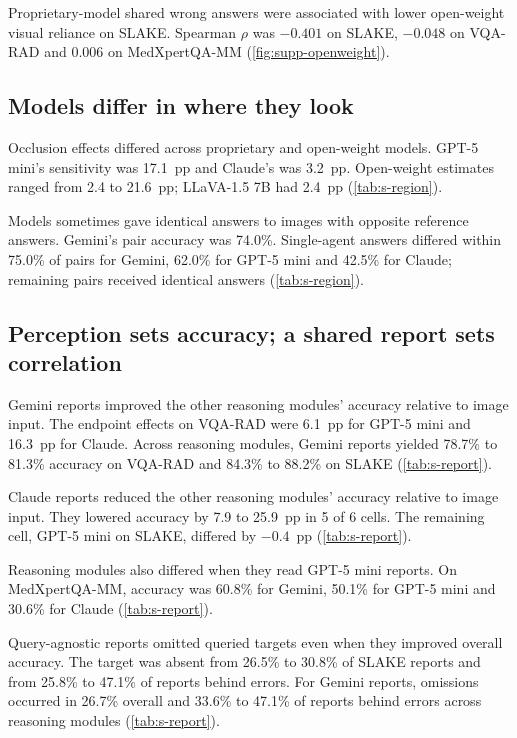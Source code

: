 Proprietary-model shared wrong answers were associated with lower open-weight visual reliance on SLAKE.
Spearman $\rho$ was $-0.401$ on SLAKE, $-0.048$ on VQA-RAD and 0.006 on MedXpertQA-MM (\cref{fig:supp-openweight}).

\subsection{Models differ in where they look}

Occlusion effects differed across proprietary and open-weight models.
GPT-5 mini's sensitivity was 17.1~pp and Claude's was 3.2~pp.
Open-weight estimates ranged from 2.4 to 21.6~pp; LLaVA-1.5 7B had 2.4~pp (\cref{tab:s-region}).

Models sometimes gave identical answers to images with opposite reference answers.
Gemini's pair accuracy was 74.0\%.
Single-agent answers differed within 75.0\% of pairs for Gemini, 62.0\% for GPT-5 mini and 42.5\% for Claude; remaining pairs received identical answers (\cref{tab:s-region}).

\subsection{Perception sets accuracy; a shared report sets correlation}

Gemini reports improved the other reasoning modules' accuracy relative to image input.
The endpoint effects on VQA-RAD were 6.1~pp for GPT-5 mini and 16.3~pp for Claude.
Across reasoning modules, Gemini reports yielded 78.7\% to 81.3\% accuracy on VQA-RAD and 84.3\% to 88.2\% on SLAKE (\cref{tab:s-report}).

Claude reports reduced the other reasoning modules' accuracy relative to image input.
They lowered accuracy by 7.9 to 25.9~pp in 5 of 6 cells.
The remaining cell, GPT-5 mini on SLAKE, differed by $-0.4$~pp (\cref{tab:s-report}).

Reasoning modules also differed when they read GPT-5 mini reports.
On MedXpertQA-MM, accuracy was 60.8\% for Gemini, 50.1\% for GPT-5 mini and 30.6\% for Claude (\cref{tab:s-report}).

Query-agnostic reports omitted queried targets even when they improved overall accuracy.
The target was absent from 26.5\% to 30.8\% of SLAKE reports and from 25.8\% to 47.1\% of reports behind errors.
For Gemini reports, omissions occurred in 26.7\% overall and 33.6\% to 47.1\% of reports behind errors across reasoning modules (\cref{tab:s-report}).


